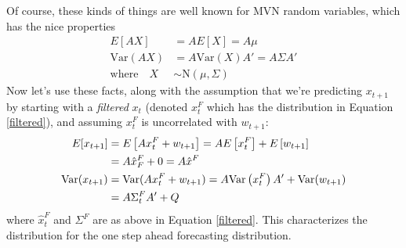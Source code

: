 \documentclass[a4paper,12pt]{article}
\begin{document}
Of course, these kinds of things are well known for  
MVN random variables, which has the nice properties
\begin{align*}
    E[AX] &= A E[X] = A \mu \\
    \text{Var}(AX) &= A \text{Var}(X) A' = A\Sigma A' \\
    \text{where} \quad X &\sim \text{N}(\mu, \Sigma)
\end{align*}
Now let's use these facts, along with the assumption
that we're predicting $x_{t+1}$ by starting with a 
\emph{filtered} $x_t$ (denoted $x^F_t$ which has the 
distribution in Equation \ref{filtered}), and 
assuming $x^F_t$ is uncorrelated with $w_{t+1}$:
\begin{align}
    E[x_{t+1}] &= E\left[A{x}^F_{t} + w_{t+1} \right] 
        = AE\left[{x}^F_{t}\right] + E\left[w_{t+1} 
            \right] \notag\\
        &= A \hat{x}^F_{F} + 0 = A \hat{x}^{F} 
            \label{intfore_mean}\\
    \text{Var}({x}_{t+1}) &= 
        \text{Var}(A{x}^F_{t} + w_{t+1}) 
        = A\text{Var}\left({x}^F_{t}\right)A' 
            +\text{Var}(w_{t+1})\notag \\
        &= A\Sigma^F_t A' + Q \label{intfore_var}
\end{align}
where $\hat{x}^F_t$ and $\Sigma^F$ are as above in Equation 
\ref{filtered}. This characterizes the distribution for the
one step ahead forecasting distribution.
\end{document}
